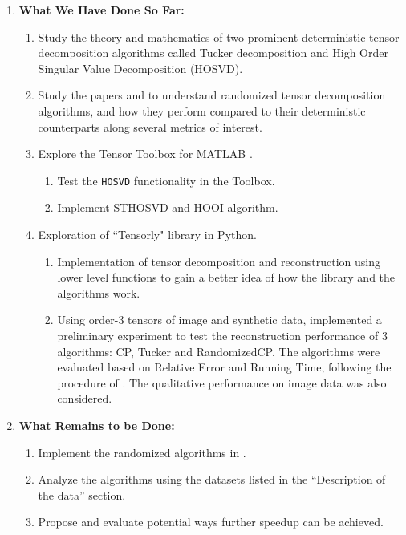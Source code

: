 \documentclass[12pt,a4paper]{article}
\begin{document}
\begin{enumerate}
    
    \item \textbf{What We Have Done So Far:}
    \begin{enumerate}
        \item Study the theory and mathematics of two prominent deterministic tensor decomposition algorithms called Tucker decomposition and High Order
        Singular Value Decomposition (HOSVD).
        \item Study the papers \cite{9350569} and \cite{Kolda2009} to understand randomized tensor decomposition algorithms, and how they perform compared to their deterministic counterparts along several metrics of interest.
        \item Explore the Tensor Toolbox for MATLAB \cite{Brett2021}.
        \begin{enumerate}
            \item Test the \texttt{HOSVD} functionality in the Toolbox.
            \item Implement STHOSVD and HOOI algorithm.
        \end{enumerate} 
        \item Exploration of ``Tensorly" \cite{tensorly} library in Python.
        \begin{enumerate}
            \item Implementation of tensor decomposition and reconstruction using lower level functions to gain a better idea of how the library and the algorithms work.
            \item Using order-3 tensors of image and synthetic data, implemented a preliminary experiment to test the reconstruction performance of 3 algorithms: CP, Tucker and RandomizedCP. The algorithms were evaluated based on Relative Error and Running Time, following the procedure of \cite{9350569}. The qualitative performance on image data was also considered. 
        \end{enumerate}
        
    \end{enumerate}
    
    \item \textbf{What Remains to be Done:}
    \begin{enumerate}
        \item Implement the randomized algorithms in \cite{9350569}.
        \item Analyze the algorithms using the datasets listed in
        the ``Description of the data'' section.
        \item Propose and evaluate potential ways further speedup can be achieved.
    \end{enumerate}
    
\end{enumerate}


\end{document}
